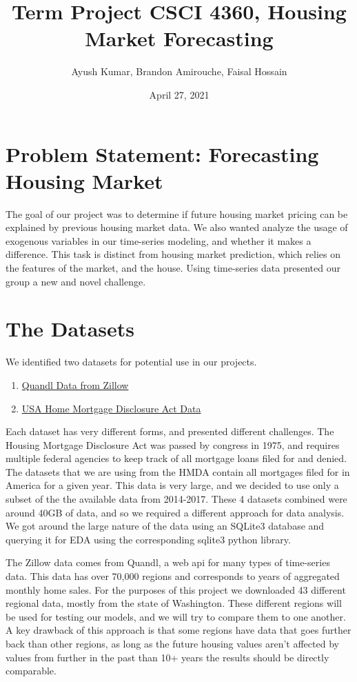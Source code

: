 \documentclass{article}
\title{Term Project CSCI 4360, Housing Market Forecasting}
\author{Ayush Kumar, Brandon Amirouche, Faisal Hossain}
\date{April 27, 2021}
\begin{document}
	\maketitle
	\tableofcontents
	\newpage
	
	\section{Problem Statement: Forecasting Housing Market}
	
	The goal of our project was to determine if future housing market pricing can be explained by 
	previous housing market data. We also wanted analyze the usage of exogenous variables in our time-series 
	modeling, and whether it makes a difference. This task is distinct from housing market prediction, which 
	relies on the features of the market, and the house. Using time-series data presented our group a new 
	and novel challenge. 

	\section{The Datasets}
	
	We identified two datasets for potential use in our projects. 
	
	\begin{enumerate}
		\item  \href{https://www.quandl.com/databases/ZILLOW/data}{Quandl Data from Zillow}
		\item \href{https://www.consumerfinance.gov/data-research/hmda/historic-data/?geo=nationwide&records=all-records&field_descriptions=labels}{USA Home Mortgage Disclosure Act Data}
	\end{enumerate}

	Each dataset has very different forms, and presented different challenges. The Housing Mortgage Disclosure Act was passed 
	by congress in 1975, and requires multiple federal agencies to keep track of all mortgage loans filed for and 
	denied. The datasets that we are using from the HMDA contain all mortgages filed for in America for a given year. 
	This data is very large, and we decided to use only a subset of the the available data from 2014-2017. These 
	4 datasets combined were around 40GB of data, and so we required a different approach for data analysis. We 
	got around the large nature of the data using an SQLite3 database and querying it for EDA using the corresponding 
	sqlite3 python library. 
	
	The Zillow data comes from Quandl, a web api for many types of time-series data. This data has over 70,000 regions
	and corresponds to years of aggregated monthly home sales. For the purposes of this project we downloaded 43 different 
	regional data, mostly from the state of Washington. These different regions will be used for testing our models, and we will try 
	to compare them to one another. A key drawback of this approach is that some regions have data that goes further back 
	than other regions, as long as the future housing values aren't affected by values from further in the past than 10+ years
	the results should be directly comparable. 
	
\end{document}
